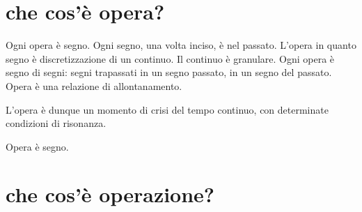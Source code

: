 \section*{che cos'è opera?}
Ogni opera è segno. Ogni segno, una volta inciso, è nel passato. L'opera in
quanto segno è discretizzazione di un continuo. Il continuo è granulare. Ogni
opera è segno di segni: segni trapassati in un segno passato, in un segno del
passato. Opera è una relazione di allontanamento.

\begin{figure}[htbp]
\begin{center}
\label{opera1}
\end{center}
\end{figure}

L'opera è dunque un momento di crisi del tempo continuo, con determinate
condizioni di risonanza.

Opera è segno.

\section*{che cos'è operazione?}

